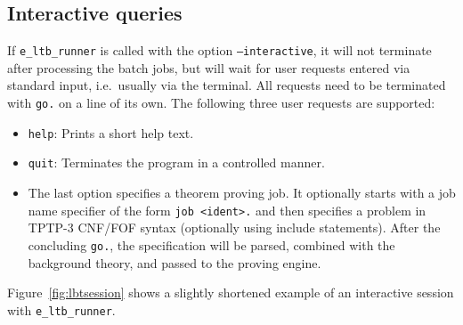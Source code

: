 \documentclass{report}
\begin{document}
\subsection{Interactive queries}
\label{sec:iq}

If \texttt{e\_ltb\_runner} is called with the option
\texttt{--interactive}, it will not terminate after processing the
batch jobs, but will wait for user requests entered via standard
input, i.e.\ usually via the terminal. All requests need to be
terminated with \texttt{go.} on a line of its own. The following three
user requests are supported:

\begin{itemize}
\item \texttt{help}: Prints a short help text.
\item \texttt{quit}: Terminates the program in a controlled manner.
\item The last option specifies a theorem proving job. It optionally
  starts with a job name specifier of the form \texttt{job <ident>.}
  and then specifies a problem in TPTP-3 CNF/FOF syntax (optionally
  using include statements). After the concluding \texttt{go.}, the
  specification will be parsed, combined with the background theory,
  and passed to the proving engine.
\end{itemize}

Figure~\ref{fig:lbtsession} shows a slightly shortened example of an
interactive session with \texttt{e\_ltb\_runner}.
\end{document}
